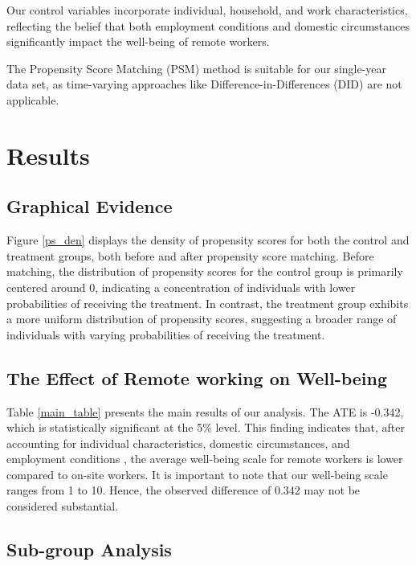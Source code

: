\documentclass[12pt]{article}
\begin{document}
Our control variables incorporate individual, household, and work characteristics, reflecting the belief that both employment conditions and domestic circumstances significantly impact the well-being of remote workers.

The Propensity Score Matching (PSM) method is suitable for our single-year data set, as time-varying approaches like Difference-in-Differences (DID) are not applicable. 

\section{Results}\label{Results}



\subsection{Graphical Evidence}
Figure \ref{ps_den} displays the density of propensity scores for both the control and treatment groups, both before and after propensity score matching. Before matching, the distribution of propensity scores for the control group is primarily centered around 0, indicating a concentration of individuals with lower probabilities of receiving the treatment. In contrast, the treatment group exhibits a more uniform distribution of propensity scores, suggesting a broader range of individuals with varying probabilities of receiving the treatment.

\subsection{The Effect of Remote working on Well-being}\label{main_result}

Table \ref{main_table} presents the main results of our analysis. The ATE is -0.342, which is statistically significant at the 5\% level. This finding indicates that, after accounting for individual characteristics, domestic circumstances, and employment conditions , the average well-being scale for remote workers is lower compared to on-site workers. It is important to note that our well-being scale ranges from 1 to 10. Hence, the observed difference of 0.342 may not be considered substantial.

\subsection{Sub-group Analysis}
\end{document}
